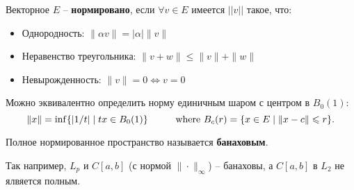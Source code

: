 
\begin{to_def}
	Векторное $E$ -- \textbf{нормировано}, если $\forall v \in E$ имеется $||v||$ такое, что:
	\begin{itemize}
		\item Однородность: $\|\alpha v\| = |\alpha| \|v\|$
		\item Неравенство треугольника: $\|v + w\| \leq \|v\| + \|w\|$
		\item Невырожденность: $\|v\| = 0 \Leftrightarrow v = 0$
	\end{itemize}
\end{to_def}

Можно эквивалентно определить норму единичным шаром с центром в $B_0(1)$:
\begin{equation*}
	\|x\| = \inf \{|1/t| \mid t x \in B_0(1)\}
	\hspace{1 cm}
	\text{where }
	B_{c}(r) = \{x \in E \mid \|x-c\| \leq r\}.
\end{equation*}

\begin{to_def}
	Полное нормированное пространство называется \textbf{банаховым}.
\end{to_def}

Так например, $L_p$ и $C[a, b]$ (с нормой $\|\cdot\|_{\infty}$) -- банаховы, а $C[a, b]$ в $L_2$ не ялвяется полным. 




